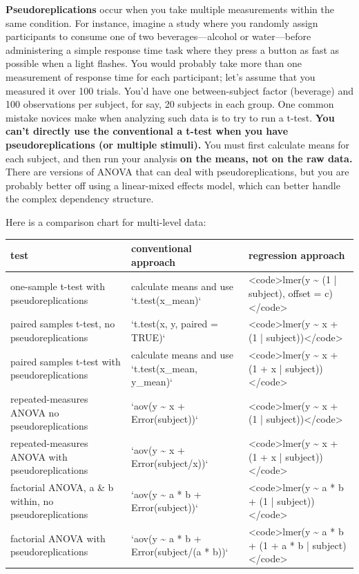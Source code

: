 \documentclass[]{book}
\begin{document}
\textbf{Pseudoreplications} occur when you take multiple measurements within the same condition. For instance, imagine a study where you randomly assign participants to consume one of two beverages---alcohol or water---before administering a simple response time task where they press a button as fast as possible when a light flashes. You would probably take more than one measurement of response time for each participant; let's assume that you measured it over 100 trials. You'd have one between-subject factor (beverage) and 100 observations per subject, for say, 20 subjects in each group. One common mistake novices make when analyzing such data is to try to run a t-test. \textbf{You can't directly use the conventional a t-test when you have pseudoreplications (or multiple stimuli).} You must first calculate means for each subject, and then run your analysis \textbf{on the means, not on the raw data.} There are versions of ANOVA that can deal with pseudoreplications, but you are probably better off using a linear-mixed effects model, which can better handle the complex dependency structure.

Here is a comparison chart for multi-level data:

\begin{tabular}{l|l|l}
\hline
test & conventional approach & regression approach\\
\hline
one-sample t-test with pseudoreplications & calculate means and use `t.test(x\_mean)` & <code>lmer(y \textasciitilde{} (1 | subject), offset = c)</code>\\
\hline
paired samples t-test, no pseudoreplications & `t.test(x, y, paired = TRUE)` & <code>lmer(y \textasciitilde{} x + (1 | subject))</code>\\
\hline
paired samples t-test with pseudoreplications & calculate means and use `t.test(x\_mean, y\_mean)` & <code>lmer(y \textasciitilde{} x + (1 + x | subject))</code>\\
\hline
repeated-measures ANOVA no pseudoreplications & `aov(y \textasciitilde{} x + Error(subject))` & <code>lmer(y \textasciitilde{} x + (1 | subject))</code>\\
\hline
repeated-measures ANOVA with pseudoreplications & `aov(y \textasciitilde{} x + Error(subject/x))` & <code>lmer(y \textasciitilde{} x + (1 + x | subject))</code>\\
\hline
factorial ANOVA, a \& b within, no pseudoreplications & `aov(y \textasciitilde{} a * b + Error(subject))` & <code>lmer(y \textasciitilde{} a * b + (1 | subject))</code>\\
\hline
factorial ANOVA with pseudoreplications & `aov(y \textasciitilde{} a * b + Error(subject/(a * b))` & <code>lmer(y \textasciitilde{} a * b + (1 + a * b | subject)</code>\\
\hline
\end{tabular}
\end{document}
